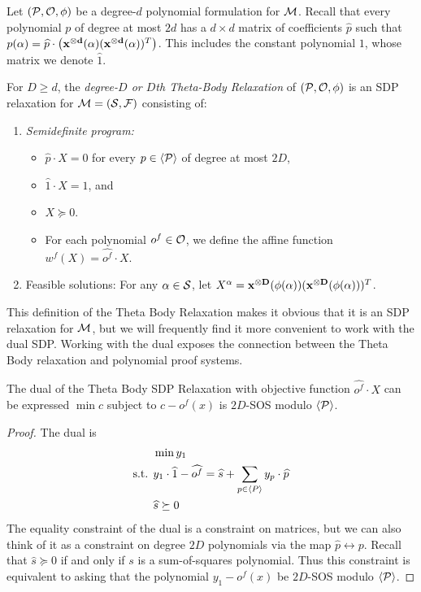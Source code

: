 Let $(\mathcal P, \mathcal O, \phi)$ be a degree-$d$ polynomial formulation for $\mathcal M$. Recall that every polynomial $p$ of degree at most $2d$ has a $d \times d$ matrix of coefficients $\widehat{p}$ such that $p(\alpha) = \widehat{p} \cdot \left(\mathbf{x^{\otimes d}}(\alpha)(\mathbf{x^{\otimes d}}(\alpha))^T\right)$. This includes the constant polynomial $1$, whose matrix we denote $\hat{1}$.
\begin{definition}
For $D \geq d$, the \emph{degree-$D$ or $D$th Theta-Body Relaxation} of $(\mathcal P,\mathcal O, \phi)$ is an SDP relaxation for $\mathcal M = (\mathcal S, \mathcal F)$ consisting of:
\begin{enumerate}
    \item \emph{Semidefinite program:} 
		\begin{itemize}
		\item $\widehat{p} \cdot X = 0$ for every $p \in \langle \mathcal P \rangle$ of degree at most $2D$, 
		\item $\widehat{1} \cdot X = 1$, and 
		\item $X \succeq 0$. 
		\item For each polynomial $o^f \in \mathcal O$, we define the affine function $w^f(X) = \widehat{o^f} \cdot X$.
		\end{itemize}
\item Feasible solutions: For any $\alpha \in \mathcal S$, let $X^\alpha = \mathbf{x^{\otimes D}}(\phi(\alpha))(\mathbf{x^{\otimes D}}(\phi(\alpha)))^T$.
\end{enumerate}
\end{definition}
This definition of the Theta Body Relaxation makes it obvious that it is an SDP relaxation for $\mathcal M$, but we will frequently find it more convenient to work with the dual SDP. Working with the dual exposes the connection between the Theta Body relaxation and polynomial proof systems.
\begin{lemma}
The dual of the Theta Body SDP Relaxation with objective function $\widehat{o^f} \cdot X$ can be expressed $\min c$ subject to $c - o^f(x)$ is $2D$-SOS modulo $\langle \mathcal P \rangle$.
\end{lemma}
\begin{proof}
The dual is
\begin{align*}
&\min y_1 \\
\text{s.t. }&y_1 \cdot \widehat{1} - \widehat{o^f} = \widehat{s} + \sum_{p \in \langle P \rangle} y_p \cdot \widehat{p} \\
&\widehat{s} \succeq 0
\end{align*}
    The equality constraint of the dual is a constraint on matrices, but we can also think of it as a constraint on degree $2D$ polynomials via the map $\widehat{p} \leftrightarrow p$. Recall that $\widehat{s} \succeq 0$ if and only if $s$ is a sum-of-squares polynomial. Thus this constraint is equivalent to asking that the polynomial $y_1 - o^f(x)$ be $2D$-SOS modulo $\langle \mathcal P \rangle$.
\end{proof}

